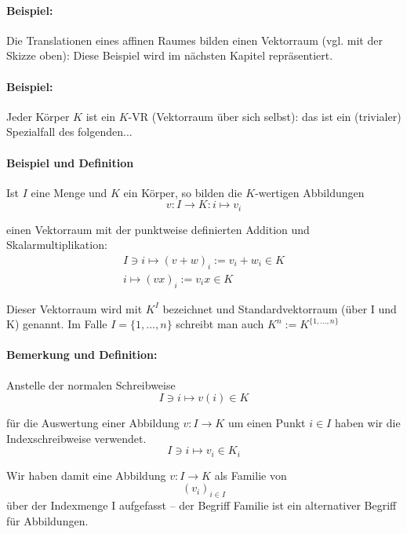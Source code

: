 \documentclass[12pt,a4paper,parskip=half-,DIV=15]{scrreprt}
\begin{document}
\paragraph{Beispiel:} Die Translationen eines affinen Raumes bilden einen Vektorraum (vgl. mit der Skizze oben): Diese Beispiel wird im nächsten Kapitel repräsentiert.
\paragraph{Beispiel:} Jeder Körper $ K $ ist ein $ K $-VR (Vektorraum über sich selbst): das ist ein (trivialer) Spezialfall des folgenden...
\paragraph{Beispiel und Definition} Ist $ I $ eine Menge und $ K $ ein Körper, so bilden die $ K $-wertigen Abbildungen
\begin{equation*}
v: I \to K: i \mapsto v_i
\end{equation*}

einen Vektorraum mit der punktweise definierten Addition und Skalarmultiplikation:
\begin{gather*}
I\ni i \mapsto (v+w)_i := v_i+w_i\in K\\
i \mapsto (vx)_i := v_ix \in K
\end{gather*}

Dieser Vektorraum wird mit $K^{I}$ bezeichnet und Standardvektorraum (über I und K) genannt. Im Falle $ I=\{1,...,n\} $ schreibt man auch $K^{n} := K^{\{1,...,n\}}$

\paragraph{Bemerkung und Definition:} Anstelle der normalen Schreibweise
\begin{equation*}
I\ni i \mapsto v(i) \in K
\end{equation*}

für die Auswertung einer Abbildung  $v: I \to K$ um einen Punkt $i\in I$ haben wir die Indexschreibweise verwendet.
\begin{equation*}
I\ni i \mapsto v_i \in K_i
\end{equation*}

Wir haben damit eine Abbildung $v: I \to K$ als Familie von
\begin{equation*}
(v_i)_{i\in I}
\end{equation*}
über der Indexmenge I aufgefasst -- der Begriff Familie ist ein \glqq alternativer\grqq{} Begriff für Abbildungen.
\end{document}
